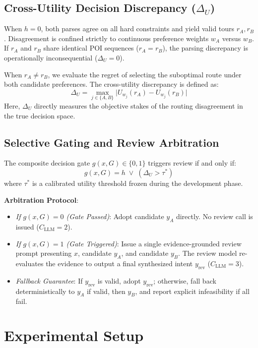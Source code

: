 \documentclass[conference]{IEEEtran}
\begin{document}
\subsection{Cross-Utility Decision Discrepancy ($\Delta_U$)}
When $h = 0$, both parses agree on all hard constraints and yield valid tours $r_A, r_B$. Disagreement is confined strictly to continuous preference weights $w_A$ versus $w_B$. If $r_A$ and $r_B$ share identical POI sequences ($r_A = r_B$), the parsing discrepancy is operationally inconsequential ($\Delta_U = 0$).

When $r_A \neq r_B$, we evaluate the regret of selecting the suboptimal route under both candidate preferences. The cross-utility discrepancy is defined as:
\begin{equation}
\Delta_U = \max_{j \in \{A, B\}} \big| U_{w_j}(r_A) - U_{w_j}(r_B) \big|
\end{equation}
Here, $\Delta_U$ directly measures the objective stakes of the routing disagreement in the true decision space.

\subsection{Selective Gating and Review Arbitration}
The composite decision gate $g(x, G) \in \{0, 1\}$ triggers review if and only if:
\begin{equation}
g(x, G) = h \;\lor\; (\Delta_U > \tau^*)
\end{equation}
where $\tau^*$ is a calibrated utility threshold frozen during the development phase.

\textbf{Arbitration Protocol}:
\begin{itemize}
    \item \textit{If $g(x, G) = 0$ (Gate Passed)}: Adopt candidate $y_A$ directly. No review call is issued ($C_{\text{LLM}} = 2$).
    \item \textit{If $g(x, G) = 1$ (Gate Triggered)}: Issue a single evidence-grounded review prompt presenting $x$, candidate $y_A$, and candidate $y_B$. The review model re-evaluates the evidence to output a final synthesized intent $y_{\text{rev}}$ ($C_{\text{LLM}} = 3$).
    \item \textit{Fallback Guarantee}: If $y_{\text{rev}}$ is valid, adopt $y_{\text{rev}}$; otherwise, fall back deterministically to $y_A$ if valid, then $y_B$, and report explicit infeasibility if all fail.
\end{itemize}

\section{Experimental Setup}
\end{document}
